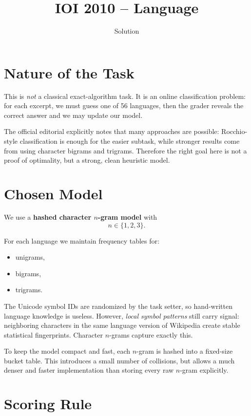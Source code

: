 \documentclass[11pt,a4paper]{article}
\title{IOI 2010 -- Language}
\author{Solution}
\date{}
\begin{document}
\maketitle

\section{Nature of the Task}

This is \emph{not} a classical exact-algorithm task. It is an online
classification problem: for each excerpt, we must guess one of 56 languages,
then the grader reveals the correct answer and we may update our model.

The official editorial explicitly notes that many approaches are possible:
Rocchio-style classification is enough for the easier subtask, while stronger
results come from using character bigrams and trigrams. Therefore the right goal
here is not a proof of optimality, but a strong, clean heuristic model.

\section{Chosen Model}

We use a \textbf{hashed character $n$-gram model} with
\[
  n \in \{1,2,3\}.
\]

For each language we maintain frequency tables for:
\begin{itemize}
  \item unigrams,
  \item bigrams,
  \item trigrams.
\end{itemize}

The Unicode symbol IDs are randomized by the task setter, so hand-written
language knowledge is useless. However, \emph{local symbol patterns} still carry
signal: neighboring characters in the same language version of Wikipedia create
stable statistical fingerprints. Character $n$-grams capture exactly this.

To keep the model compact and fast, each $n$-gram is hashed into a fixed-size
bucket table. This introduces a small number of collisions, but allows a much
denser and faster implementation than storing every raw $n$-gram explicitly.

\section{Scoring Rule}
\end{document}
